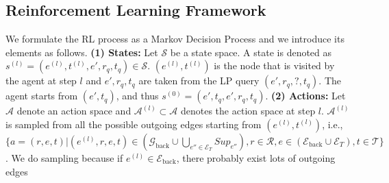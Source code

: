 \documentclass[runningheads]{llncs}
\begin{document}
\subsection{Reinforcement Learning Framework}
\label{sec: RL framework}
We formulate the RL process as a Markov Decision Process and we introduce its elements as follows.
\textbf{(1) States:} Let $\mathcal{S}$ be a state space. A state is denoted as 
$s^{(l)} = (e^{(l)}, t^{(l)}, e', r_q, t_q) \in \mathcal{S}$. $(e^{(l)}, t^{(l)})$ is the node that is 
visited by the agent at step $l$ and $e', r_q, t_q$ are taken from the LP query $(e', r_q, ?, t_q)$. 
The agent starts from $(e', t_q)$, and thus $s^{(0)} = (e', t_q, e', r_q, t_q)$.
\textbf{(2) Actions:} Let $\mathcal{A}$ denote an action space and $\mathcal{A}^{(l)} \subset \mathcal{A}$ denotes the action space at step $l$. $\mathcal{A}^{(l)}$ is sampled from all the possible outgoing edges starting from $(e^{(l)}, t^{(l)})$, i.e., $\{a=(r, e, t)| (e^{(l)}, r, e, t) \in (\mathcal{G}_{\text{back}} \cup \bigcup_{e'' \in \mathcal{E}_T} Sup_{e''}), r \in \mathcal{R}, e \in (\mathcal{E}_{\text{back}} \cup \mathcal{E}_T), t \in \mathcal{T}\}$. 
We do sampling because if $e^{(l)} \in \mathcal{E}_{\text{back}}$, there probably exist lots of outgoing edges 
\end{document}
